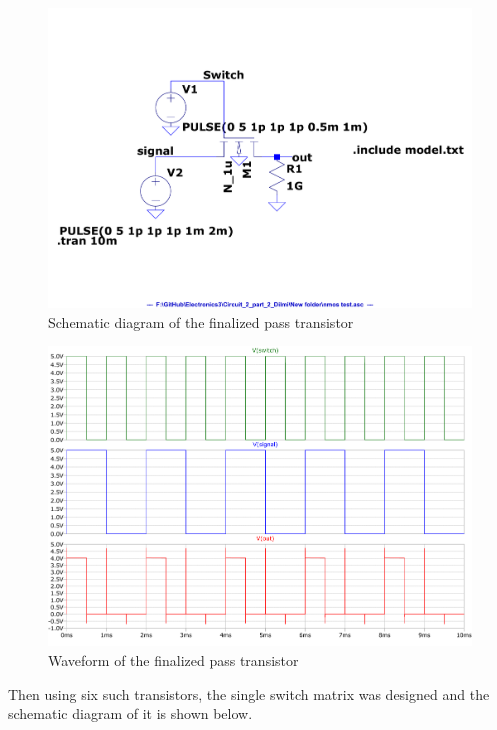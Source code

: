 \documentclass[a4paper,11pt]{article}%
\begin{document}
\begin{figure}[H]
	\centering
	\includegraphics[scale=0.4]{figures/2part2/pass_ttr.pdf}
	\caption{Schematic diagram of the finalized pass transistor}
\end{figure}
\begin{figure}[H]
	\centering
	\includegraphics[scale=0.5]{figures/2part2/pass_wave.pdf}
	\caption{Waveform of the finalized pass transistor}
\end{figure}

Then using six such transistors, the single switch matrix was designed and the schematic diagram of it is shown below.
\end{document}
